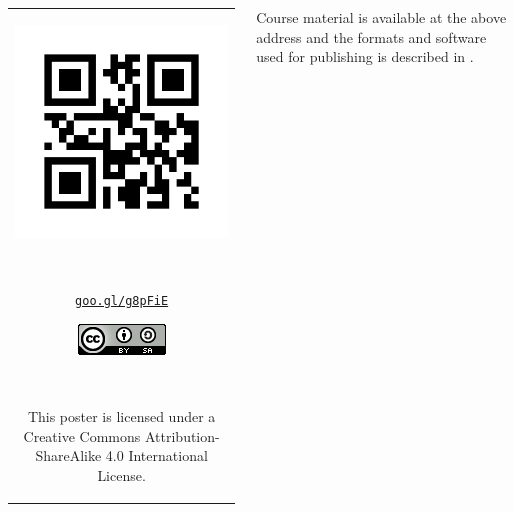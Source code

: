 \documentclass[25pt, margin=0mm, innermargin=25mm, blockverticalspace=25mm, colspace=25mm, subcolspace=8mm]{tikzposter}
\begin{document}
\begin{columns}
{\begin{center}
\begin{tabular}{c}
\begin{minipage}{\qrcodesize}
\includegraphics[width=\textwidth]{url_g8pFiE_qrcode.png}
\end{minipage}
~
\begin{minipage}{0.15\linewidth}
\small {\href{https://goo.gl/g8pFiE}{\nolinkurl{goo.gl/g8pFiE}}}
\end{minipage}
\hspace{0.1\linewidth}
\begin{minipage}{0.1\linewidth}
\href{http://creativecommons.org/licenses/by-sa/4.0/}{\includegraphics[width=\textwidth]{ccbysa}}
\end{minipage}
~
\begin{minipage}{0.35\linewidth}
\small This poster is licensed under a Creative Commons Attribution-ShareAlike 4.0 International License.
\end{minipage}

\end{tabular}
\end{center}

Course material is available at the above address and the formats and software used for publishing
is described in \cite{petras2015integrating}.

\vspace{-0.08cm}

}

\end{columns}
\end{document}
